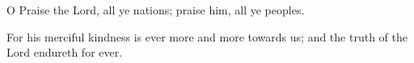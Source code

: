 ﻿\item O Praise the Lord, all ye nations; praise him, all ye peoples.
\item For his merciful kindness is ever more and more towards us; and the truth of the Lord endureth for ever.